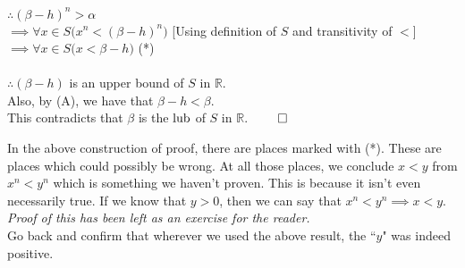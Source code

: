 $\therefore (\beta-h)^n > \alpha$\\
$\implies \forall x \in S\big(x^n < (\beta - h)^n\big)$ \hfill [Using definition of $S$ and transitivity of $<$]\\
$\implies \forall x \in S\big(x < \beta - h\big)$ \hfill (*)\\~\\
$\therefore (\beta - h)$ is an upper bound of $S$ in $\mathbb{R}$.\\
Also, by (A), we have that $\beta - h < \beta$.\\
This contradicts that $\beta$ is the $\operatorname{lub}$ of $S$ in $\mathbb{R}$. \hfill $\qed$ \\

\dotfill

In the above construction of proof, there are places marked with (*). These are places which could possibly be wrong. At all those places, we conclude $x < y$ from $x^n < y^n$ which is something we haven't proven. This is because it isn't even necessarily true. If we know that $y > 0$, then we can say that $x^n < y^n \implies x < y$.\\
\textit{Proof of this has been left as an exercise for the reader.}\\
Go back and confirm that wherever we used the above result, the ``$y$" was indeed positive.